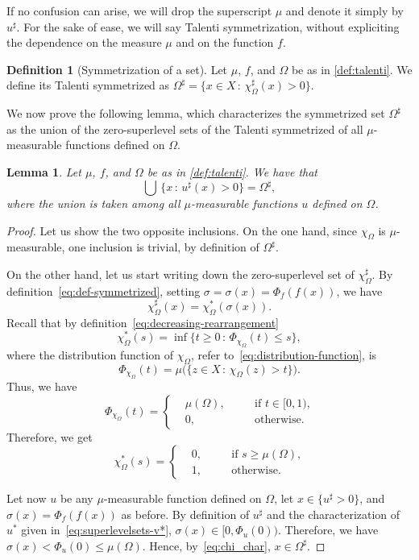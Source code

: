 \documentclass[a4paper,12pt,reqno]{amsart}
\numberwithin{equation}{section}
\theoremstyle{plain}
\newtheorem{lemma}[theorem]{Lemma}
\theoremstyle{definition}
\newtheorem{definition}[theorem]{Definition}
\begin{document}
If no confusion can arise, we will drop the superscript $\mu$ and denote it simply by $u^\sharp$. For the sake of ease, we will say Talenti symmetrization, without expliciting the dependence on the measure $\mu$ and on the function $f$.

\begin{definition}[Symmetrization of a set]
%
Let $\mu$, $f$, and $\Omega$ be as in \cref{def:talenti}. We define its Talenti symmetrized as
%
\(
\Omega^\sharp = \{x\in X\,:\, \chi_\Omega^\sharp(x)>0 \}.
\)
%
\end{definition}


We now prove the following lemma, which characterizes the symmetrized set $\Omega^\sharp$ as the union of the zero-superlevel sets of the Talenti symmetrized of all $\mu$-measurable functions defined on $\Omega$.

\begin{lemma}
\label{lem:levelset-symmetrizedset-inclusion}
%
Let $\mu$, $f$, and $\Omega$ be as in \cref{def:talenti}. We have that
%
\[
\bigcup\, \{ x\,:\, u^\sharp (x) > 0\} = \Omega^\sharp,
\]
%
where the union is taken among all $\mu$-measurable functions $u$ defined on $\Omega$.
%
\end{lemma}

\begin{proof}
%
Let us show the two opposite inclusions. On the one hand, since $\chi_\Omega$ is $\mu$-measurable, one inclusion is trivial, by definition of $\Omega^\sharp$.

On the other hand, let us start writing down the zero-superlevel set of $\chi_\Omega^\sharp$. By definition~\eqref{eq:def-symmetrized}, setting $\sigma=\sigma(x)=\Phi_f(f(x))$, we have
%
\[
\chi_\Omega^\sharp(x) = \chi_\Omega^* (\sigma(x)).
\]
%
Recall that by definition~\eqref{eq:decreasing-rearrangement}
%
\[
\chi_\Omega^*(s) = \inf\{t\ge 0\,:\, \Phi_{\chi_\Omega}(t)\le s\},
\]
%
where the distribution function of $\chi_\Omega$, refer to~\eqref{eq:distribution-function}, is
%
\[
\Phi_{\chi_\Omega}(t) = \mu\bigl(\{z\in X\,:\, \chi_\Omega(z) > t \}\bigr).
\]
%
Thus, we have
%
\[
\Phi_{\chi_\Omega}(t) 
=
\left\{
\begin{aligned}
&\mu(\Omega), \quad &&\text{if $t\in[0,1)$,}\\
&0, &&\text{otherwise.}
\end{aligned}
\right.
\]
%
Therefore, we get
\begin{equation}
\label{eq:chi_char}
\chi_\Omega^*(s) 
=
\left\{
\begin{aligned}
&0, \quad &&\text{if $s\ge\mu(\Omega)$,}\\
&1, &&\text{otherwise.}
\end{aligned}
\right.
\end{equation}
%

Let now $u$ be any $\mu$-measurable function defined on $\Omega$, let $x \in \{u^\sharp>0\}$, and $\sigma(x)=\Phi_f(f(x))$ as before. By definition of $u^\sharp$ and the characterization of $u^*$ given in~\eqref{eq:superlevelsets-v*},
%
\(
\sigma(x) \in [0, \Phi_u(0)).
\)
%
Therefore, we have $\sigma(x) < \Phi_u(0) \le \mu(\Omega)$. Hence, by~\eqref{eq:chi_char}, $x\in\Omega^\sharp$.
%
\end{proof}
\end{document}
